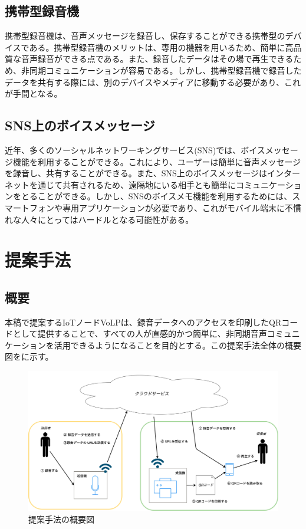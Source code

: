 \documentclass[submit,techrep,noauthor]{ipsj}
\begin{document}
\subsection{携帯型録音機}
携帯型録音機は、音声メッセージを録音し、保存することができる携帯型のデバイスである。携帯型録音機のメリットは、専用の機器を用いるため、簡単に高品質な音声録音ができる点である。また、録音したデータはその場で再生できるため、非同期コミュニケーションが容易である。しかし、携帯型録音機で録音したデータを共有する際には、別のデバイスやメディアに移動する必要があり、これが手間となる。

\subsection{SNS上のボイスメッセージ}
近年、多くのソーシャルネットワーキングサービス(SNS)では、ボイスメッセージ機能を利用することができる。これにより、ユーザーは簡単に音声メッセージを録音し、共有することができる。また、SNS上のボイスメッセージはインターネットを通じて共有されるため、遠隔地にいる相手とも簡単にコミュニケーションをとることができる。しかし、SNSのボイスメモ機能を利用するためには、スマートフォンや専用アプリケーションが必要であり、これがモバイル端末に不慣れな人々にとってはハードルとなる可能性がある。

\section{提案手法}
\label{system}
\subsection{概要}
本稿で提案するIoTノードVoLPは、録音データへのアクセスを印刷したQRコードとして提供することで、すべての人が直感的かつ簡単に、非同期音声コミュニケーションを活用できるようになることを目的とする。この提案手法全体の概要図をに示す。\par

\begin{figure}[tb]
\includegraphics[scale=0.15,bb= 0 0 2000 1000]{./image/overview_drawio.png}
\caption{提案手法の概要図}
\label{fig:sys-overview}
\end{figure}
\end{document}
